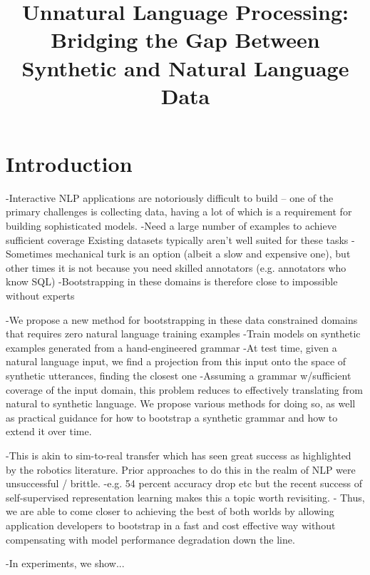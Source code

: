 \documentclass{article}
\title{Unnatural Language Processing:\\Bridging the Gap Between Synthetic and Natural Language Data}
\author
\begin{document}
\maketitle

\begin{abstract} 

\end{abstract}

\section{Introduction}
-Interactive NLP applications are notoriously difficult to build -- one of the primary challenges is collecting data, having a lot of which is a requirement for building sophisticated models. 
-Need a large number of examples to achieve sufficient coverage 
Existing datasets typically aren't well suited for these tasks
-Sometimes mechanical turk is an option (albeit a slow and expensive one), but other times it is not because you need skilled annotators (e.g. annotators who know SQL) 
-Bootstrapping in these domains is therefore close to impossible without experts 

-We propose a new method for bootstrapping in these data constrained domains that requires zero natural language training examples
-Train models on synthetic examples generated from a hand-engineered grammar 
-At test time, given a natural language input, we find a projection from this input onto the space of synthetic utterances, finding the closest one 
-Assuming a grammar w/sufficient coverage of the input domain, this problem reduces to effectively translating from natural to synthetic language. We propose various methods for doing so, as well as practical guidance for how to bootstrap a synthetic grammar and how to extend it over time.

-This is akin to sim-to-real transfer which has seen great success as highlighted by the robotics literature. Prior approaches to do this in the realm of NLP were unsuccessful / brittle. 
-e.g. 54 percent accuracy drop etc but the recent success of self-supervised representation learning makes this a topic worth revisiting. 
- Thus, we are able to come closer to achieving the best of both worlds by allowing application developers to bootstrap in a fast and cost effective way without compensating with model performance degradation down the line. 


-In experiments, we show... 
\end{document}
